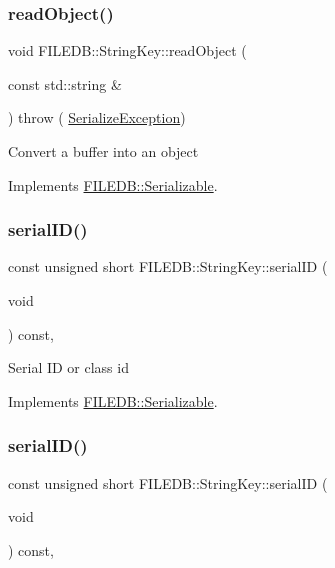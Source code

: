 \subsubsection{\texorpdfstring{readObject()}{readObject()}\hspace{0.1cm}{\footnotesize\ttfamily [3/3]}}
{\footnotesize\ttfamily void F\+I\+L\+E\+D\+B\+::\+String\+Key\+::read\+Object (\begin{DoxyParamCaption}\item[{const std\+::string \&}]{ }\end{DoxyParamCaption}) throw ( \mbox{\hyperlink{classFILEDB_1_1SerializeException}{Serialize\+Exception}}) \hspace{0.3cm}{\ttfamily [virtual]}}

Convert a buffer into an object 

Implements \mbox{\hyperlink{classFILEDB_1_1Serializable_a21a5831fa4f65790490a8a5eba9fcab2}{F\+I\+L\+E\+D\+B\+::\+Serializable}}.

\mbox{\label{classFILEDB_1_1StringKey_ad139b5cab667be479edae524f436805a}} 
\subsubsection{\texorpdfstring{serialID()}{serialID()}\hspace{0.1cm}{\footnotesize\ttfamily [1/3]}}
{\footnotesize\ttfamily const unsigned short F\+I\+L\+E\+D\+B\+::\+String\+Key\+::serial\+ID (\begin{DoxyParamCaption}\item[{void}]{ }\end{DoxyParamCaption}) const\hspace{0.3cm}{\ttfamily [inline]}, {\ttfamily [virtual]}}

Serial ID or class id 

Implements \mbox{\hyperlink{classFILEDB_1_1Serializable_a5d639b5dbd5d8ebc7dca1eca31bbc868}{F\+I\+L\+E\+D\+B\+::\+Serializable}}.

\mbox{\label{classFILEDB_1_1StringKey_ad139b5cab667be479edae524f436805a}} 
\subsubsection{\texorpdfstring{serialID()}{serialID()}\hspace{0.1cm}{\footnotesize\ttfamily [2/3]}}
{\footnotesize\ttfamily const unsigned short F\+I\+L\+E\+D\+B\+::\+String\+Key\+::serial\+ID (\begin{DoxyParamCaption}\item[{void}]{ }\end{DoxyParamCaption}) const\hspace{0.3cm}{\ttfamily [inline]}, {\ttfamily [virtual]}}

